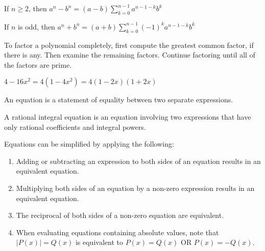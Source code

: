 \documentclass[crop=false,class=book,oneside]{standalone}
\begin{document}
            \begin{theorem*}
                If ${n}\geq{2}$, then
                $a^{n}-b^{n}=(a-b)\sum_{k=0}^{n-1}a^{n-1-k}b^{k}$
            \end{theorem*}
            \begin{theorem*}
                If $n$ is odd, then
                $a^{n}+b^{n}=%
                 (a+b)\sum_{k=0}^{n-1}(-1)^{k}a^{n-1-k}b^{k}$
            \end{theorem*}
            To factor a polynomial completely,
            first compute the greatest common factor,
            if there is any. Then examine the remaining factors.
            Continue factoring until all of the factors are prime.
            \begin{example}
                $4-16x^{2}=4(1-4x^{2})=4(1-2x)(1+2x)$
            \end{example}
            \begin{definition}
                An equation is a statement of equality
                between two separate expressions.
            \end{definition}
            \begin{definition}
                A rational integral equation is an equation
                involving two expressions that have only rational
                coefficients and integral powers.
            \end{definition}
            Equations can be simplified by applying the following:
            \begin{enumerate}
                \item Adding or subtracting an expression to both
                    sides of an equation results in an equivalent
                    equation.
                \item Multiplying both sides of an equation by a
                    non-zero expression results in an equivalent
                    equation.
                \item The reciprocal of both sides of a non-zero
                    equation are equivalent.
                \item When evaluating equations containing
                    absolute values, note that $|P(x)|=Q(x)$ is
                    equivalent to $P(x)=Q(x)$ OR $P(x)=-Q(x)$.
            \end{enumerate}
\end{document}
